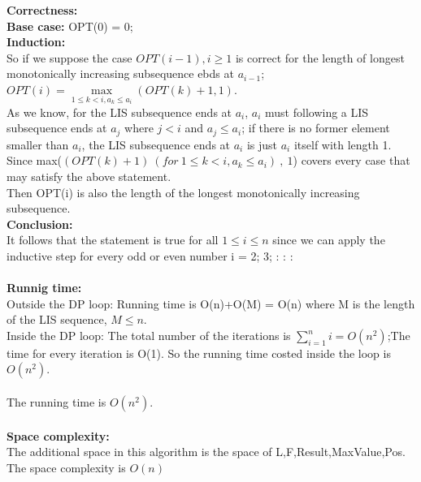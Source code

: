 \documentclass{article}
\begin{document}
\noindent\textbf{\large Correctness:\\}
\textbf{Base case: } OPT(0) = 0;\\
\textbf{Induction:} \\
So if we suppose the case $OPT(i-1),i \ge 1$ is correct for the length of longest monotonically increasing subsequence ebds at $a_{i-1}$;\\
$OPT(i) = \max\limits_{1\le k<i,a_k\le a_i}(OPT(k)+1,1)$.\\
As we know, for the LIS subsequence ends at $a_i$, $a_i$ must following a LIS subsequence ends at $a_j$ where $j < i$ and $a_j \le a_i$; if there is no former element smaller than $a_i$, the LIS subsequence ends at $a_i$ is just $a_i$ itself with length 1.\\
Since max($(OPT(k)+1)\ (for\ 1\le k<i,a_k\le a_i)\ ,\ 1$) covers every case that may satisfy the above statement.\\
Then OPT(i) is also the length of the longest monotonically increasing subsequence.\\
\textbf{Conclusion:\\}
It follows that the statement is true for all $1\le i \le n$ since we can apply the inductive step for every odd or even number i = 2; 3; : : :\\\\
\textbf{\large Runnig time:\\}
Outside the DP loop: Running time is O(n)+O(M) = O(n) where M is the length of the LIS sequence, $M\le n$.\\
Inside the DP loop: The total number of the iterations is  $\sum_{i=1}^n i = O(n^2)$;The time for every iteration is O(1). So the running time costed inside the loop is $O(n^2).$\\\\
The running time is $O(n^2).$\\\\
\textbf{\large Space complexity:\\}
The additional space in this algorithm is the space of L,F,Result,MaxValue,Pos.\\
The space complexity is $O(n)$


\clearpage
\end{document}
